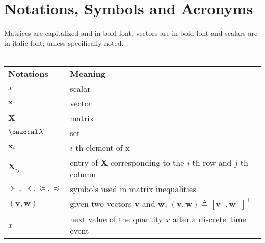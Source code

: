 \chapter*{Notations, Symbols and Acronyms}
\label{symbols_notations}

Matrices are capitalized and in bold font, vectors are in bold font and scalars are in italic font; unless specifically noted.
\mbox{}\\
\mbox{}\\
\begin{tabularx}{0.95\textwidth}{p{2.75cm} X}
 \textbf{Notations} 	&\textbf{Meaning}\\
 $x$                    & scalar\\
 $\mathbf{x}$                  & vector\\
 $\mathbf{X}$           & matrix\\
 $\X$                   & set\\
 $\mathbf{x}_i$                &$i$-th element of $\mathbf{x}$\\
 $\mathbf{X}_{ij}$      &entry of $\mathbf{X}$ corresponding to the $i$-th row and $j$-th column\\
 $\succ,\prec,\succeq,\preceq$ & symbols used in matrix inequalities\\
 $(\mathbf{v},\mathbf{w})$ & given two vectors $\mathbf{v}$ and $\mathbf{w}$,  $(\mathbf{v},\mathbf{w})\triangleq \left[\mathbf{v}^\top,\mathbf{w}^\top\right]^\top$ \\
 $x^+$                  &next value of the quantity $x$ after a discrete--time event
\end{tabularx}

